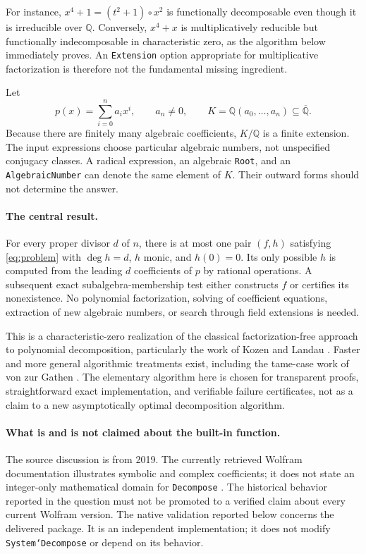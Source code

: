 \documentclass[11pt,a4paper]{article}
\numberwithin{equation}{section}
\theoremstyle{definition}
\theoremstyle{remark}
\newcommand{\Q}{\mathbb{Q}}
\newcommand{\Qbar}{\overline{\mathbb{Q}}}
\newcommand{\code}[1]{\texttt{#1}}
\begin{document}
For instance, $x^4+1=(t^2+1)\circ x^2$ is functionally decomposable even though
it is irreducible over $\Q$. Conversely, $x^4+x$ is multiplicatively reducible
but functionally indecomposable in characteristic zero, as the algorithm below
immediately proves. An \code{Extension} option appropriate for multiplicative
factorization is therefore not the fundamental missing ingredient.

Let
\begin{equation}
 p(x)=\sum_{i=0}^{n}a_i x^i,\qquad a_n\ne0,
 \qquad K=\Q(a_0,\ldots,a_n)\subseteq\Qbar.
 \label{eq:input}
\end{equation}
Because there are finitely many algebraic coefficients, $K/\Q$ is a finite
extension. The input expressions choose particular algebraic numbers, not
unspecified conjugacy classes. A radical expression, an algebraic
\code{Root}, and an \code{AlgebraicNumber} can denote the same element of $K$.
Their outward forms should not determine the answer.

\paragraph{The central result.}
For every proper divisor $d$ of $n$, there is at most one pair $(f,h)$ satisfying
\eqref{eq:problem} with $\deg h=d$, $h$ monic, and $h(0)=0$. Its only possible
$h$ is computed from the leading $d$ coefficients of $p$ by rational
operations. A subsequent exact subalgebra-membership test either constructs
$f$ or certifies its nonexistence. No polynomial factorization, solving of
coefficient equations, extraction of new algebraic numbers, or search through
field extensions is needed.

This is a characteristic-zero realization of the classical factorization-free
approach to polynomial decomposition, particularly the work of Kozen and
Landau \cite{KL}. Faster and more general algorithmic treatments exist,
including the tame-case work of von zur Gathen \cite{Gathen}. The elementary
algorithm here is chosen for transparent proofs, straightforward exact
implementation, and verifiable failure certificates, not as a claim to a new
asymptotically optimal decomposition algorithm.

\paragraph{What is and is not claimed about the built-in function.}
The source discussion is from 2019. The currently retrieved Wolfram
documentation illustrates symbolic and complex coefficients; it does not
state an integer-only mathematical domain for \code{Decompose} \cite{Decompose}.
The historical behavior reported in the question must not be promoted to a
verified claim about every current Wolfram version. The native validation
reported below concerns the delivered package. It is an independent implementation;
it does not modify \code{System`Decompose} or depend on its behavior.
\end{document}
